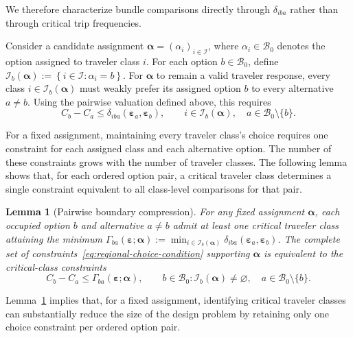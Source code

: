 \documentclass{article}
\newtheorem{lemma}{Lemma}
\begin{document}
We therefore characterize bundle comparisons directly through
$\delta_{iba}$ rather than through critical trip frequencies.

Consider a candidate assignment
$\bm\alpha=(\alpha_i)_{i\in\mathcal I}$, where
$\alpha_i\in\mathcal B_0$ denotes the option assigned to traveler class
$i$. For each option $b\in\mathcal B_0$, define
$
    \mathcal I_b(\bm\alpha)
    :=
    \left\{
        i\in\mathcal I:
        \alpha_i=b
    \right\}.
$ For $\bm\alpha$ to remain a valid traveler response, every class
$i\in\mathcal I_b(\bm\alpha)$ must weakly prefer its assigned option
$b$ to every alternative $a\neq b$. Using the pairwise valuation
defined above, this requires
\begin{equation}
    C_b-C_a
    \leq
    \delta_{iba}(\bm\varepsilon_a,\bm\varepsilon_b),
    \qquad
    i\in\mathcal I_b(\bm\alpha),
    \quad
    a\in\mathcal B_0\setminus\{b\}.
    \label{eq:regional-choice-condition}
\end{equation}

For a fixed assignment, maintaining every traveler class's choice
requires one constraint for each assigned class and each alternative
option. The number of these constraints grows with the number of
traveler classes. The following lemma shows that, for each ordered
option pair, a critical traveler class determines a single constraint
equivalent to all class-level comparisons for that pair.

\begin{lemma}[Pairwise boundary compression]
For any fixed assignment $\bm\alpha$, each occupied option $b$ and
alternative $a\neq b$ admit at least one critical traveler class
attaining the minimum
$
    \Gamma_{ba}(\bm\varepsilon;\bm\alpha)
    :=
    \min_{i\in\mathcal I_b(\bm\alpha)}
    \delta_{iba}(\bm\varepsilon_a,\bm\varepsilon_b)
$.
The complete set of constraints~\eqref{eq:regional-choice-condition} supporting
$\bm\alpha$ is equivalent to the critical-class constraints
\begin{equation}
    C_b-C_a
    \leq
    \Gamma_{ba}(\bm\varepsilon;\bm\alpha),
    \qquad
    b\in\mathcal B_0:
    \mathcal I_b(\bm\alpha)\neq\varnothing,
    \quad
    a\in\mathcal B_0\setminus\{b\}.
    \label{eq:compressed-assignment-condition}
\end{equation}
\label{lem:pairwise-boundary-compression}
\end{lemma}

Lemma~\ref{lem:pairwise-boundary-compression} implies that, for a fixed
assignment, identifying critical traveler classes can substantially
reduce the size of the design problem by retaining only one choice
constraint per ordered option pair.
\end{document}
